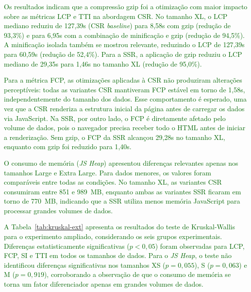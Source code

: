 \documentclass{sbc2019}%
\begin{document}


\textcolor{darkgreen}{Os resultados indicam que a compressão gzip foi a otimização com maior impacto sobre as métricas LCP e TTI na abordagem CSR. No tamanho XL, o LCP mediano reduziu de 127{,}39s (CSR \textit{baseline}) para 8{,}58s com gzip (redução de 93{,}3\%) e para 6{,}95s com a combinação de minificação e gzip (redução de 94{,}5\%). A minificação isolada também se mostrou relevante, reduzindo o LCP de 127{,}39s para 60{,}59s (redução de 52{,}4\%). Para a SSR, a aplicação de gzip reduziu o LCP mediano de 29{,}35s para 1{,}46s no tamanho XL (redução de 95{,}0\%).}

\textcolor{darkgreen}{Para a métrica FCP, as otimizações aplicadas à CSR não produziram alterações perceptíveis: todas as variantes CSR mantiveram FCP estável em torno de 1{,}58s, independentemente do tamanho dos dados. Esse comportamento é esperado, uma vez que a CSR renderiza a estrutura inicial da página antes de carregar os dados via JavaScript. Na SSR, por outro lado, o FCP é diretamente afetado pelo volume de dados, pois o navegador precisa receber todo o HTML antes de iniciar a renderização. Sem gzip, o FCP da SSR alcançou 29{,}28s no tamanho XL, enquanto com gzip foi reduzido para 1{,}40s.}

\textcolor{darkgreen}{O consumo de memória (\textit{JS Heap}) apresentou diferenças relevantes apenas nos tamanhos Large e Extra Large. Para dados menores, os valores foram comparáveis entre todas as condições. No tamanho XL, as variantes CSR consumiram entre 851 e 989~MB, enquanto ambas as variantes SSR ficaram em torno de 770~MB, indicando que a SSR utiliza menos memória JavaScript para processar grandes volumes de dados.}

\textcolor{darkgreen}{A Tabela~\ref{tab:kruskal-ext} apresenta os resultados do teste de Kruskal-Wallis para o experimento ampliado, considerando os seis grupos experimentais. Diferenças estatisticamente significativas ($p < 0{,}05$) foram observadas para LCP, FCP, SI e TTI em todos os tamanhos de dados. Para o \textit{JS Heap}, o teste não identificou diferenças significativas nos tamanhos XS ($p = 0{,}055$), S ($p = 0{,}063$) e M ($p = 0{,}919$), corroborando a observação de que o consumo de memória se torna um fator diferenciador apenas em grandes volumes de dados.}


\end{document}
